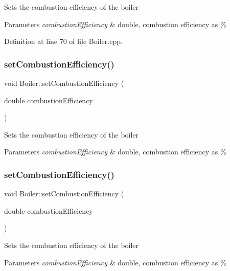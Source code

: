 Sets the combustion efficiency of the boiler 
\begin{DoxyParams}{Parameters}
{\em combustion\+Efficiency} & double, combustion efficiency as \% \\
\hline
\end{DoxyParams}


Definition at line 70 of file Boiler.\+cpp.

\mbox{\label{class_boiler_abef6bc48101f98f0650cb07fb1d51f74}} 
\subsubsection{\texorpdfstring{set\+Combustion\+Efficiency()}{setCombustionEfficiency()}\hspace{0.1cm}{\footnotesize\ttfamily [2/3]}}
{\footnotesize\ttfamily void Boiler\+::set\+Combustion\+Efficiency (\begin{DoxyParamCaption}\item[{double}]{combustion\+Efficiency }\end{DoxyParamCaption})}

Sets the combustion efficiency of the boiler 
\begin{DoxyParams}{Parameters}
{\em combustion\+Efficiency} & double, combustion efficiency as \% \\
\hline
\end{DoxyParams}
\mbox{\label{class_boiler_abef6bc48101f98f0650cb07fb1d51f74}} 
\subsubsection{\texorpdfstring{set\+Combustion\+Efficiency()}{setCombustionEfficiency()}\hspace{0.1cm}{\footnotesize\ttfamily [3/3]}}
{\footnotesize\ttfamily void Boiler\+::set\+Combustion\+Efficiency (\begin{DoxyParamCaption}\item[{double}]{combustion\+Efficiency }\end{DoxyParamCaption})}

Sets the combustion efficiency of the boiler 
\begin{DoxyParams}{Parameters}
{\em combustion\+Efficiency} & double, combustion efficiency as \% \\
\hline
\end{DoxyParams}
\mbox{\label{class_boiler_a56f422254606ebba1248ae0b4f8f0215}} 
